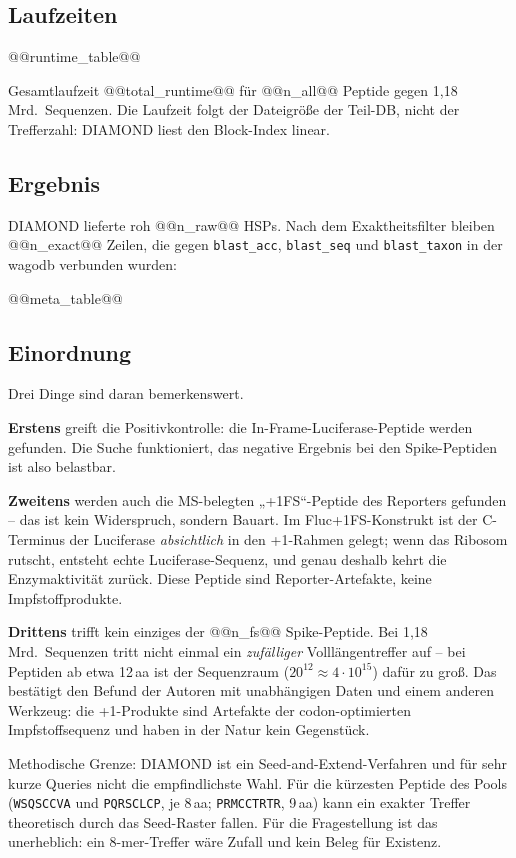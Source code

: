 \documentclass[11pt,a4paper]{article}
\begin{document}
\subsection{Laufzeiten}

@@runtime_table@@

Gesamtlaufzeit @@total_runtime@@ für @@n_all@@ Peptide gegen 1,18\,Mrd.\ Sequenzen.
Die Laufzeit folgt der Dateigröße der Teil-DB, nicht der Trefferzahl: DIAMOND
liest den Block-Index linear.

\subsection{Ergebnis}
\label{sec:ergebnis}

DIAMOND lieferte roh @@n_raw@@ HSPs. Nach dem Exaktheitsfilter bleiben
@@n_exact@@ Zeilen, die gegen \texttt{blast\_acc}, \texttt{blast\_seq} und
\texttt{blast\_taxon} in der wagodb verbunden wurden:

\footnotesize
@@meta_table@@
\normalsize

\subsection{Einordnung}

Drei Dinge sind daran bemerkenswert.

\textbf{Erstens} greift die Positivkontrolle: die In-Frame-Luciferase-Peptide
werden gefunden. Die Suche funktioniert, das negative Ergebnis bei den
Spike-Peptiden ist also belastbar.

\textbf{Zweitens} werden auch die MS-belegten „+1FS``-Peptide des Reporters
gefunden -- das ist kein Widerspruch, sondern Bauart. Im Fluc+1FS-Konstrukt ist
der C-Terminus der Luciferase \emph{absichtlich} in den +1-Rahmen gelegt; wenn
das Ribosom rutscht, entsteht echte Luciferase-Sequenz, und genau deshalb
kehrt die Enzymaktivität zurück. Diese Peptide sind Reporter-Artefakte, keine
Impfstoffprodukte.

\textbf{Drittens} trifft kein einziges der @@n_fs@@ Spike-Peptide. Bei
1,18\,Mrd.\ Sequenzen tritt nicht einmal ein \emph{zufälliger}
Volllängentreffer auf -- bei Peptiden ab etwa 12\,aa ist der Sequenzraum
($20^{12} \approx 4 \cdot 10^{15}$) dafür zu groß. Das bestätigt den Befund der
Autoren mit unabhängigen Daten und einem anderen Werkzeug: die +1-Produkte sind
Artefakte der codon-optimierten Impfstoffsequenz und haben in der Natur kein
Gegenstück.

Methodische Grenze: DIAMOND ist ein Seed-and-Extend-Verfahren und für sehr
kurze Queries nicht die empfindlichste Wahl. Für die kürzesten Peptide des
Pools (\texttt{WSQSCCVA} und \texttt{PQRSCLCP}, je 8\,aa;
\texttt{PRMCCTRTR}, 9\,aa) kann ein exakter Treffer theoretisch durch das
Seed-Raster fallen. Für die Fragestellung ist das unerheblich: ein
8-mer-Treffer wäre Zufall und kein Beleg für Existenz.
\end{document}
